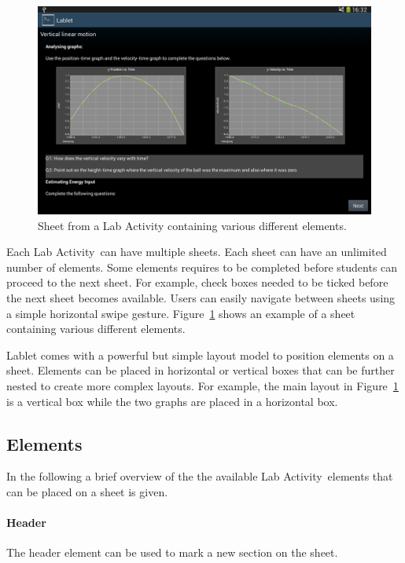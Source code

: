 \documentclass{sigchi}
\newcommand{\labactivity}{Lab Activity\ }
\begin{document}
\begin{figure}
  \centering
  \includegraphics[width=.99\columnwidth]{LabActivitySheet}
  \caption{\label{fig:LabActivitySheet}Sheet from a Lab Activity containing various different elements.} 
\end{figure}

Each \labactivity can have multiple sheets.
Each sheet can have an unlimited number of elements.
Some elements requires to be completed before students can proceed to the next sheet.
For example, check boxes needed to be ticked before the next sheet becomes available.
Users can easily navigate between sheets using a simple horizontal swipe gesture.
Figure~\ref{fig:LabActivitySheet} shows an example of a sheet containing various different elements.

Lablet comes with a powerful but simple layout model to position elements on a sheet.
Elements can be placed in horizontal or vertical boxes that can be further nested to create more complex layouts.
For example, the main layout in Figure~\ref{fig:LabActivitySheet} is a vertical box while the two graphs are placed in a horizontal box.

\subsection{Elements}
In the following a brief overview of the the available \labactivity elements that can be placed on a sheet is given.

\paragraph{Header}
The header element can be used to mark a new section on the sheet.
\end{document}
